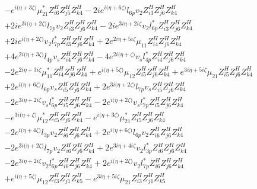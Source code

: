 \begin{align}
 &- e^{i \Big(\eta +3 \zeta \Big)} \mu_{21}^* Z_{{i 6}}^{H} Z_{{j 5}}^{H} Z_{{k 4}}^{H} -2 i e^{i \Big(\eta +6 \zeta \Big)} l_{6p} v_2 Z_{{i 3}}^{H} Z_{{j 6}}^{H} Z_{{k 4}}^{H} \nonumber \\ 
 &+2 i e^{3 i \Big(\eta +2 \zeta \Big)} l_{7p} v_2 Z_{{i 3}}^{H} Z_{{j 6}}^{H} Z_{{k 4}}^{H} -2 i e^{3 i \eta +2 i \zeta } v_2 l_{6p}^* Z_{{i 3}}^{H} Z_{{j 6}}^{H} Z_{{k 4}}^{H} \nonumber \\ 
 &+2 i e^{i \Big(\eta +2 \zeta \Big)} v_2 l_{7p}^* Z_{{i 3}}^{H} Z_{{j 6}}^{H} Z_{{k 4}}^{H} +2 e^{2 i \eta +5 i \zeta } \mu_{11} Z_{{i 4}}^{H} Z_{{j 6}}^{H} Z_{{k 4}}^{H} \nonumber \\ 
 &+4 e^{2 i \Big(\eta +3 \zeta \Big)} l_{4p} v_s Z_{{i 4}}^{H} Z_{{j 6}}^{H} Z_{{k 4}}^{H} -4 e^{2 i \Big(\eta +\zeta \Big)} v_s l_{4p}^* Z_{{i 4}}^{H} Z_{{j 6}}^{H} Z_{{k 4}}^{H} \nonumber \\ 
 &-2 e^{2 i \eta +3 i \zeta } \mu_{11}^* Z_{{i 4}}^{H} Z_{{j 6}}^{H} Z_{{k 4}}^{H} +e^{i \Big(\eta +5 \zeta \Big)} \mu_{12} Z_{{i 5}}^{H} Z_{{j 6}}^{H} Z_{{k 4}}^{H} +e^{3 i \eta +5 i \zeta } \mu_{21} Z_{{i 5}}^{H} Z_{{j 6}}^{H} Z_{{k 4}}^{H} \nonumber \\ 
 &+2 e^{i \Big(\eta +6 \zeta \Big)} l_{6p} v_s Z_{{i 5}}^{H} Z_{{j 6}}^{H} Z_{{k 4}}^{H} +2 e^{3 i \Big(\eta +2 \zeta \Big)} l_{7p} v_s Z_{{i 5}}^{H} Z_{{j 6}}^{H} Z_{{k 4}}^{H} \nonumber \\ 
 &-2 e^{3 i \eta +2 i \zeta } v_s l_{6p}^* Z_{{i 5}}^{H} Z_{{j 6}}^{H} Z_{{k 4}}^{H} -2 e^{i \Big(\eta +2 \zeta \Big)} v_s l_{7p}^* Z_{{i 5}}^{H} Z_{{j 6}}^{H} Z_{{k 4}}^{H} \nonumber \\ 
 &- e^{3 i \Big(\eta +\zeta \Big)} \mu_{12}^* Z_{{i 5}}^{H} Z_{{j 6}}^{H} Z_{{k 4}}^{H} - e^{i \Big(\eta +3 \zeta \Big)} \mu_{21}^* Z_{{i 5}}^{H} Z_{{j 6}}^{H} Z_{{k 4}}^{H} \nonumber \\ 
 &-2 e^{i \Big(\eta +4 \zeta \Big)} l_{3p} v_2 Z_{{i 6}}^{H} Z_{{j 6}}^{H} Z_{{k 4}}^{H} +2 e^{i \Big(\eta +6 \zeta \Big)} l_{6p} v_2 Z_{{i 6}}^{H} Z_{{j 6}}^{H} Z_{{k 4}}^{H} \nonumber \\ 
 &-2 e^{3 i \Big(\eta +2 \zeta \Big)} l_{7p} v_2 Z_{{i 6}}^{H} Z_{{j 6}}^{H} Z_{{k 4}}^{H} +2 e^{3 i \eta +4 i \zeta } v_2 l_{3p}^* Z_{{i 6}}^{H} Z_{{j 6}}^{H} Z_{{k 4}}^{H} \nonumber \\ 
 &-2 e^{3 i \eta +2 i \zeta } v_2 l_{6p}^* Z_{{i 6}}^{H} Z_{{j 6}}^{H} Z_{{k 4}}^{H} +2 e^{i \Big(\eta +2 \zeta \Big)} v_2 l_{7p}^* Z_{{i 6}}^{H} Z_{{j 6}}^{H} Z_{{k 4}}^{H} \nonumber \\ 
 &+e^{i \Big(\eta +5 \zeta \Big)} \mu_{12} Z_{{i 3}}^{H} Z_{{j 1}}^{H} Z_{{k 5}}^{H} - e^{3 i \eta +5 i \zeta } \mu_{21} Z_{{i 3}}^{H} Z_{{j 1}}^{H} Z_{{k 5}}^{H} \nonumber \\ 

\end{align}

